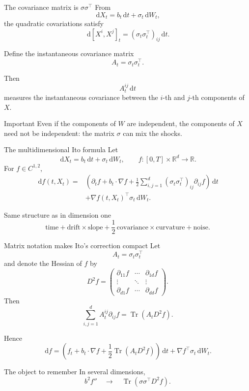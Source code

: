 \documentclass[handout,10pt,aspectratio=169]{beamer}
\newcommand{\R}{\mathbb R}
\newcommand{\dd}{\,\mathrm d}
\begin{document}
\begin{frame}[shrink=5]{The covariance matrix is \(\sigma\sigma^\top\)}
From
\[
\dd X_t=b_t\dd t+\sigma_t\dd W_t,
\]
the quadratic covariations satisfy
\[
\boxed{
\dd[X^i,X^j]_t
=
(\sigma_t\sigma_t^\top)_{ij}\dd t.}
\]

Define the instantaneous covariance matrix
\[
A_t=\sigma_t\sigma_t^\top.
\]

Then
\[
A_t^{ij}\dd t
\]
measures the instantaneous covariance between the \(i\)-th and \(j\)-th
components of \(X\).

\begin{block}{Important}
Even if the components of \(W\) are independent, the components of \(X\)
need not be independent: the matrix \(\sigma\) can mix the shocks.
\end{block}
\end{frame}


\begin{frame}{The multidimensional Ito formula}
Let
\[
\dd X_t=b_t\dd t+\sigma_t\dd W_t,
\qquad
f:[0,T]\times\R^d\to\R.
\]
For \(f\in C^{1,2}\),
\[
\boxed{
\begin{aligned}
\dd f(t,X_t)
={}&
\left(
\partial_t f
+
b_t\cdot\nabla f
+
\frac12
\sum_{i,j=1}^d
(\sigma_t\sigma_t^\top)_{ij}
\partial_{ij}f
\right)\dd t\\
&+
\nabla f(t,X_t)^\top\sigma_t\dd W_t.
\end{aligned}}
\]

\begin{block}{Same structure as in dimension one}
\[
\text{time}
+\text{drift}\times\text{slope}
+\frac12\,\text{covariance}\times\text{curvature}
+\text{noise}.
\]
\end{block}
\end{frame}


\begin{frame}[shrink=5]{Matrix notation makes Ito's correction compact}
Let
\[
A_t=\sigma_t\sigma_t^\top
\]
and denote the Hessian of \(f\) by
\[
D^2f=
\begin{pmatrix}
\partial_{11}f & \cdots & \partial_{1d}f\\
\vdots & \ddots & \vdots\\
\partial_{d1}f & \cdots & \partial_{dd}f
\end{pmatrix}.
\]
Then
\[
\sum_{i,j=1}^d A_t^{ij}\partial_{ij}f
=
\operatorname{Tr}\!\left(A_tD^2f\right).
\]

Hence
\[
\boxed{
\dd f
=
\left(
f_t+b_t\cdot\nabla f
+\frac12\operatorname{Tr}(A_tD^2f)
\right)\dd t
+
\nabla f^\top\sigma_t\dd W_t.}
\]

\begin{block}{The object to remember}
In several dimensions,
\[
b^2f''\quad\longrightarrow\quad
\operatorname{Tr}(\sigma\sigma^\top D^2f).
\]
\end{block}
\end{frame}
\end{document}
